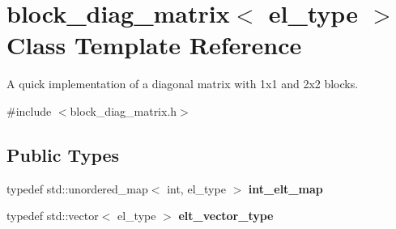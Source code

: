 \hypertarget{classblock__diag__matrix}{}\section{block\+\_\+diag\+\_\+matrix$<$ el\+\_\+type $>$ Class Template Reference}
\label{classblock__diag__matrix}


A quick implementation of a diagonal matrix with 1x1 and 2x2 blocks.  




{\ttfamily \#include $<$block\+\_\+diag\+\_\+matrix.\+h$>$}

\subsection*{Public Types}
\begin{DoxyCompactItemize}
\item 
typedef std\+::unordered\+\_\+map$<$ int, el\+\_\+type $>$ {\bfseries int\+\_\+elt\+\_\+map}\hypertarget{classblock__diag__matrix_a83f8d88c5e6d2bdaee582cad484cc793}{}\label{classblock__diag__matrix_a83f8d88c5e6d2bdaee582cad484cc793}

\item 
typedef std\+::vector$<$ el\+\_\+type $>$ {\bfseries elt\+\_\+vector\+\_\+type}\hypertarget{classblock__diag__matrix_ab9eac6089c211c3332e3e3acc2c5dd89}{}\label{classblock__diag__matrix_ab9eac6089c211c3332e3e3acc2c5dd89}

\end{DoxyCompactItemize}
